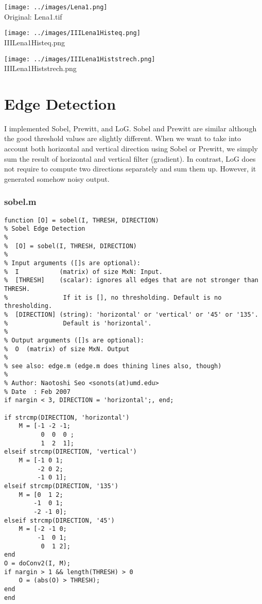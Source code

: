 \documentclass[article,oneside]{memoir}
\begin{document}
\begin{highboostfilter2.m}
\begin{center}
\texttt{[image: ../images/Lena1.png]}\\
Original: Lena1.tif
\end{center}

\begin{center}
\texttt{[image: ../images/IIILena1Histeq.png]}\\
IIILena1Histeq.png
\end{center}

\begin{center}
\texttt{[image: ../images/IIILena1Histstrech.png]}\\
IIILena1Histstrech.png
\end{center}

\newpage

\chapter{Edge Detection}

I implemented Sobel, Prewitt, and LoG.
Sobel and Prewitt are similar although the good threshold values are slightly different. 
When we want to take into account both horizontal and vertical direction using Sobel or Prewitt, we simply sum the result of horizontal and vertical filter (gradient). 
In contrast, LoG does not require to compute two directions separately and sum them up. 
However, it generated somehow noisy output. 

\subsection{sobel.m}

\begin{verbatim}
function [O] = sobel(I, THRESH, DIRECTION)
% Sobel Edge Detection
%
%  [O] = sobel(I, THRESH, DIRECTION)
%
% Input arguments ([]s are optional):
%  I           (matrix) of size MxN: Input.
%  [THRESH]    (scalar): ignores all edges that are not stronger than THRESH.
%               If it is [], no thresholding. Default is no thresholding.
%  [DIRECTION] (string): 'horizontal' or 'vertical' or '45' or '135'. 
%               Default is 'horizontal'.
%
% Output arguments ([]s are optional):
%  O  (matrix) of size MxN. Output
%
% see also: edge.m (edge.m does thining lines also, though)
%
% Author: Naotoshi Seo <sonots(at)umd.edu>
% Date  : Feb 2007
if nargin < 3, DIRECTION = 'horizontal';, end;

if strcmp(DIRECTION, 'horizontal')
    M = [-1 -2 -1;
          0  0  0 ;
          1  2  1];
elseif strcmp(DIRECTION, 'vertical')
    M = [-1 0 1;
         -2 0 2;
         -1 0 1];
elseif strcmp(DIRECTION, '135')
    M = [0  1 2;
        -1  0 1;
        -2 -1 0];
elseif strcmp(DIRECTION, '45')
    M = [-2 -1 0;
         -1  0 1;
          0  1 2];
end
O = doConv2(I, M);
if nargin > 1 && length(THRESH) > 0
    O = (abs(O) > THRESH);
end
end
\end{verbatim}


\end{highboostfilter2.m}
\end{document}
